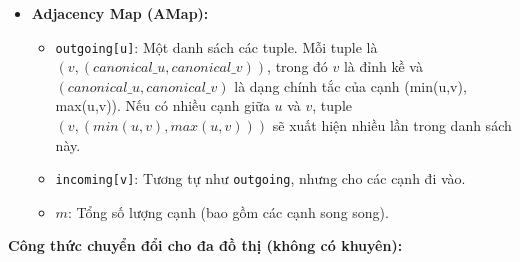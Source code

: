 \documentclass{article}
\begin{document}
\begin{itemize}
\begin{itemize}
        \item \textbf{Adjacency Map (AMap):}
        \begin{itemize}
            \item \texttt{outgoing[u]}: Một danh sách các tuple. Mỗi tuple là $(v, (canonical\_u, canonical\_v))$, trong đó $v$ là đỉnh kề và $(canonical\_u, canonical\_v)$ là dạng chính tắc của cạnh (min(u,v), max(u,v)). Nếu có nhiều cạnh giữa $u$ và $v$, tuple $(v, (min(u,v), max(u,v)))$ sẽ xuất hiện nhiều lần trong danh sách này.
            \item \texttt{incoming[v]}: Tương tự như \texttt{outgoing}, nhưng cho các cạnh đi vào.
            \item $m$: Tổng số lượng cạnh (bao gồm các cạnh song song).
        \end{itemize}
    \end{itemize}
\end{itemize}

\textbf{Công thức chuyển đổi cho đa đồ thị (không có khuyên):}
\end{document}
